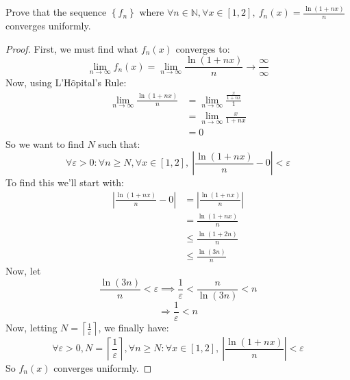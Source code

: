 \documentclass{article}
\newcommand{\vep}{\varepsilon}
\newcommand{\abs}[1]{\left\vert#1\right\vert}
\begin{document}
	\item Prove that the sequence $\left\{f_n\right\}$ where $\forall n \in \mathbb{N}, \forall x \in \left[1,2\right],\ f_n(x) = \frac{\ln(1+nx)}{n}$ converges uniformly.
	\begin{proof}
	First, we must find what $f_n(x)$ converges to:
	$$\lim_{n\to\infty} f_n(x) = \lim_{n\to\infty} \frac{\ln(1+nx)}{n} \to \frac{\infty}{\infty}$$
	Now, using L'H$\hat{\text{o}}$pital's Rule:
	\begin{align*}
	\lim_{n\to\infty} \frac{\ln(1+nx)}{n} &= \lim_{n\to\infty}\frac{\frac{x}{1+nx}}{1}\\
	&= \lim_{n\to\infty}\frac{x}{1+nx}\\
	&= 0
	\end{align*}
	So we want to find $N$ such that:
	$$\forall \vep > 0: \forall n \geq N, \forall x \in [1,2],\ \abs{\frac{\ln(1+nx)}{n}-0} < \vep$$
	To find this we'll start with:
	\begin{align*}
	\abs{\frac{\ln(1+nx)}{n}-0} &= \abs{\frac{\ln(1+nx)}{n}}\\
	&= \frac{\ln(1+nx)}{n}\\
	&\leq \frac{\ln(1+2n)}{n}\\
	&\leq \frac{\ln(3n)}{n}
	\end{align*}
	Now, let $$\frac{\ln(3n)}{n} < \vep \implies \frac{1}{\vep} < \frac{n}{\ln(3n)} < n$$
	$$\Rightarrow \frac{1}{\vep} < n $$
	Now, letting $N = \left\lceil\frac{1}{\vep}\right\rceil$, we finally have:
	$$\forall \vep > 0, N = \left\lceil\frac{1}{\vep}\right\rceil, \forall n \geq N: \forall x \in [1,2],\ \abs{\frac{\ln(1+nx)}{n}} < \vep$$
	So $f_n(x)$ converges uniformly.
	
	\end{proof}
	
\end{document}
